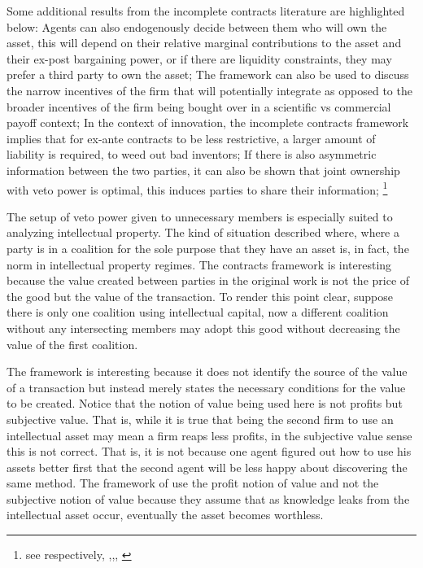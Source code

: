\documentclass[12pt]{article}
\numberwithin{equation}{section}
\begin{document}
Some additional results from the incomplete contracts literature are highlighted below: Agents can also endogenously decide between them who will own the asset, this will depend on their relative marginal contributions to the asset and their ex-post bargaining power, or if there are liquidity constraints, they may prefer a third party to own the asset; The framework can also be used to discuss the narrow incentives of the firm that will potentially integrate as opposed to the broader incentives of the firm being bought over in a scientific vs commercial payoff context; In the context of innovation, the incomplete contracts framework implies that for ex-ante contracts to be less restrictive, a larger amount of liability is required, to weed out bad inventors; If there is also asymmetric information between the two parties, it can also be shown that joint ownership with veto power is optimal, this induces parties to share their information; \footnote{see respectively, \cite{Aghion1994},\citep{lerner2010contractibility},\citep{anton1994expropriation}, \citep{Rosenkranz1999}}

The setup of veto power given to unnecessary members is especially suited to analyzing intellectual property. The kind of situation described where, where a party is in a coalition for the sole purpose that they have an asset is, in fact, the norm in intellectual property regimes. The contracts framework is interesting because the value created between parties in the original work is not the price of the good but the value of the transaction. To render this point clear, suppose there is only one coalition using intellectual capital, now a different coalition without any intersecting members may adopt this good without decreasing the value of the first coalition.

The framework is interesting because it does not identify the source of the value of a transaction but instead merely states the necessary conditions for the value to be created. Notice that the notion of value being used here is not profits but subjective value. That is, while it is true that being the second firm to use an intellectual asset may mean a firm reaps less profits, in the subjective value sense this is not correct. That is, it is not because one agent figured out how to use his assets better first that the second agent will be less happy about discovering the same method. The framework of \cite{anton1994expropriation} use the profit notion of value and not the subjective notion of value because they assume that as knowledge leaks from the intellectual asset occur, eventually the asset becomes worthless.
\end{document}
